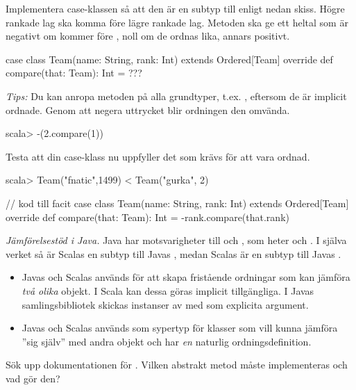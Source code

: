 \Subtask Implementera case-klassen  så att den är en subtyp till  enligt nedan skiss. Högre rankade lag ska komma före lägre rankade lag. Metoden  ska ge ett heltal som är negativt om  kommer före , noll om de ordnas lika, annars positivt. 

\begin{Code}
case class Team(name: String, rank: Int) extends Ordered[Team]{
  override def compare(that: Team): Int = ???
} 
\end{Code}
\emph{Tips:} Du kan anropa metoden  på alla grundtyper, t.ex. , eftersom de är implicit ordnade. Genom att negera uttrycket blir ordningen den omvända.
\begin{REPL}
scala> -(2.compare(1))  
\end{REPL}

\Subtask Testa att  din case-klass nu uppfyller det som krävs för att vara ordnad. 
\begin{REPL}
scala> Team("fnatic",1499) < Team("gurka", 2) 
\end{REPL}

\begin{CodeSmall}
// kod till facit
case class  Team(name: String, rank: Int) extends Ordered[Team]{
  override def compare(that: Team): Int = -rank.compare(that.rank)
} 
\end{CodeSmall}

\Task \emph{Jämförelsestöd i Java.} 
Java har motsvarigheter till  och , som heter  och . I själva verket så är Scalas  en subtyp till Javas , medan Scalas  är en subtyp till Javas . 
\begin{itemize}[nolistsep, noitemsep]
\item Javas  och Scalas  används för att skapa fristående ordningar som kan jämföra \emph{två olika} objekt. I Scala kan dessa göras implicit tillgängliga. I Javas samlingsbibliotek skickas instanser av  med som explicita argument.
\item Javas  och Scalas  används som sypertyp för klasser som vill kunna jämföra ''sig själv'' med andra objekt och har \emph{en} naturlig ordningsdefinition.
\end{itemize}

\Subtask\Pen Sök upp dokumentationen för . Vilken abstrakt metod måste implementeras och vad gör den? 

